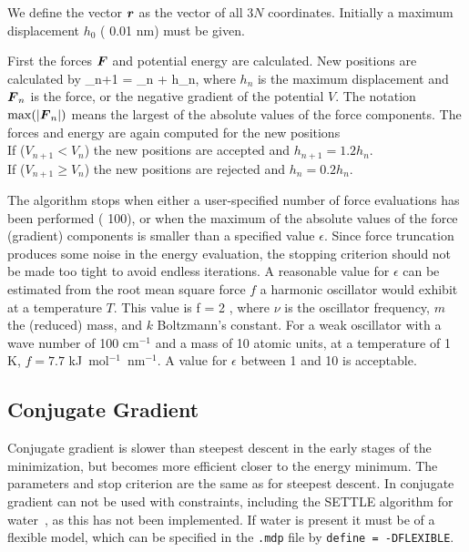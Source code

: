 We define the vector $\ve{r}$ as the vector of all $3N$ coordinates.
Initially a maximum displacement $h_0$ ({\eg} 0.01 nm) must be given. 

First the forces $\ve{F}$ and potential energy are calculated.
New positions are calculated by
\beq
{}_{n+1} =  _n +  h_n,
\eeq
where $h_n$ is the maximum displacement and $\ve{F}_n$ is the force,
or the negative gradient of the  potential $V$. The notation $\max
(|\ve{F}_n|)$ means the largest of the absolute values of the force
components.  The forces and energy are again computed for the new positions \\
If ($V_{n+1} < V_n$) the new positions are accepted and $h_{n+1} = 1.2
h_n$. \\
If ($V_{n+1} \geq V_n$) the new positions are rejected and $h_n = 0.2 h_n$.

The algorithm stops when either a user-specified number of force 
evaluations has been performed ({\eg} 100), or when the maximum of the absolute
values of the force (gradient) components is smaller than a specified
value $\epsilon$.
Since force truncation produces some noise in the
energy evaluation, the stopping criterion should not be made too tight
to avoid endless iterations. A reasonable value for $\epsilon$ can be
estimated from the root mean square force $f$ a harmonic oscillator would exhibit at a
temperature $T$. This value is
\beq
  f = 2 \pi \nu {},
\eeq
where $\nu$ is the oscillator frequency, $m$ the (reduced) mass, and
$k$ Boltzmann's constant. For a weak oscillator with a wave number of
100 cm$^{-1}$ and a mass of 10 atomic units, at a temperature of 1 K,
$f=7.7$ kJ~mol$^{-1}$~nm$^{-1}$. A value for $\epsilon$ between 1 and
10 is acceptable.   

\subsection{Conjugate Gradient}
Conjugate gradient is slower than steepest descent in the early stages
of the minimization, but becomes more efficient closer to the energy
minimum.  The parameters and stop criterion are the same as for
steepest descent.  In {\gromacs} conjugate gradient can not be used
with constraints, including the SETTLE algorithm for
water~\cite{Miyamoto92}, as this has not been implemented. If water is
present it must be of a flexible model, which can be specified in the
{\tt *.mdp} file by {\tt define = -DFLEXIBLE}.

